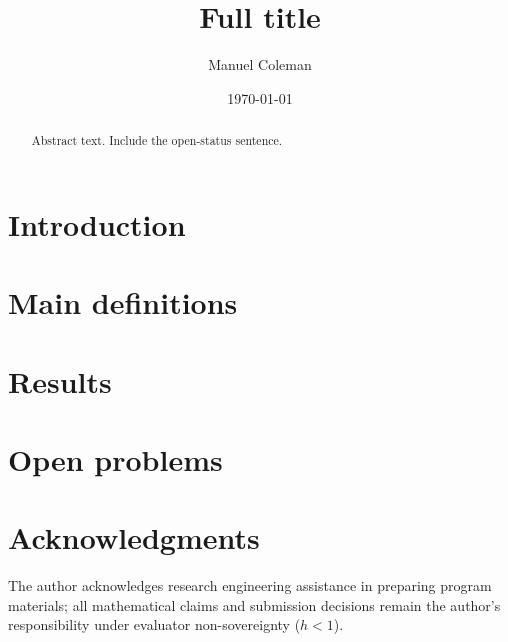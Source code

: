 \documentclass[11pt]{amsart}
\title[Short title]{Full title}
\author{Manuel Coleman}
\date{\today}
\theoremstyle{plain}
\theoremstyle{definition}
\begin{document}
\begin{abstract}
  Abstract text. Include the open-status sentence.
  \PeAIceOpenTargets
\end{abstract}


\maketitle

\section{Introduction}


\section{Main definitions}

\section{Results}

\section{Open problems}

\section*{Acknowledgments}
The author acknowledges research engineering assistance in preparing program
materials; all mathematical claims and submission decisions remain the author's
responsibility under evaluator non-sovereignty ($h<1$).



\end{document}
